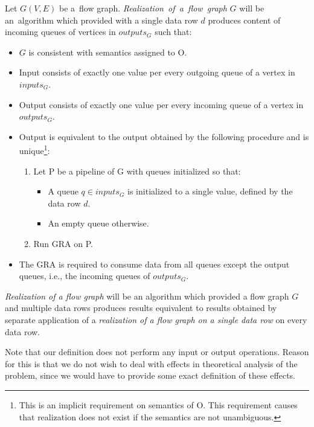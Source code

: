 \begin{define}
  Let $G(V,E)$ be a~flow graph. \emph{Realization~of~a~flow~graph} $G$ will be an~algorithm which provided with a single data row $d$ produces content of incoming queues of vertices in $outputs_G$ such that: 
  \begin{itemize}
    \item $G$ is consistent with semantics assigned to O.
    \item Input consists of exactly one value per every outgoing queue of a vertex in $inputs_G$.
    \item Output consists of exactly one value per every incoming queue of a vertex in $outputs_G$.
    \item Output is equivalent to the output obtained by the following procedure and is unique\footnote{This is an implicit requirement on semantics of O. This requirement causes that realization does not exist if the semantics are not unambiguous.}:
    \begin{enumerate}
      \item Let P be a pipeline of G with queues initialized so that:
      \begin{itemize}
        \item A queue $q \in inputs_G$ is initialized to a single value, defined by the data row $d$.
        \item An empty queue otherwise.
      \end{itemize}
      \item Run GRA on P.
    \end{enumerate}
    \item The GRA is required to consume data from all queues except the output queues, i.e., the incoming queues of $outputs_G$.
  \end{itemize}
\end{define}


\begin{define}
  \emph{Realization of a flow graph} will be an algorithm which provided a flow graph $G$ and multiple data rows produces results equivalent to results obtained by separate application of a \emph{realization of a flow graph on a single data row} on every data row.
\end{define}


Note that our definition does not perform any input or output operations. Reason for this is that we do not wish to deal with effects in theoretical analysis of the problem, since we would have to provide some exact definition of these effects.


